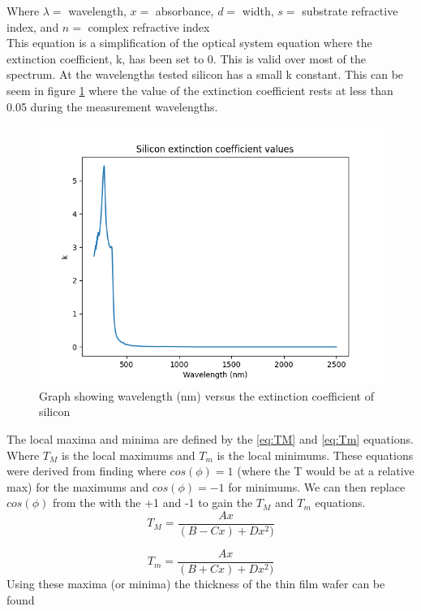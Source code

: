\documentclass[10pt,a4paper]{article}
\begin{document}
\begin{multicols}{2}
Where $\lambda =$ wavelength, $x =$ absorbance, $d =$ width,  $s =$ substrate refractive index, and $n =$ complex refractive index\\
This equation is a simplification of the optical system equation where the extinction coefficient, k, has been set to 0. This is valid over most of the spectrum\cite{marq}. At the wavelengths tested silicon has a small k constant. This can be seem in figure \ref{Sik} where the value of the extinction coefficient rests at less than 0.05 during the measurement wavelengths.
\begin{figure}[H]
\label{Sik}
\includegraphics[scale=0.5]{Sik}
\caption{Graph showing wavelength (nm) versus the extinction coefficient of silicon\cite{siK}}
\end{figure}

The local maxima and minima are defined by the \ref{eq:TM} and \ref{eq:Tm} equations. Where $T_M$ is the local maximums and $T_m$ is the local minimums.
These equations were derived from finding where $cos(\phi) = 1$ (where the T would be at a relative max) for the maximums and  $cos(\phi) = -1$ for minimums. We can then replace $cos(\phi)$ from the with the +1 and -1 to gain the $T_M$ and $T_m$ equations\cite{marq}.
\begin{equation}
\label{eq:TM}
T_M = \dfrac{Ax}{(B-Cx)+Dx^2)}
\end{equation}

\begin{equation}
\label{eq:Tm}
T_m = \dfrac{Ax}{(B+Cx)+Dx^2)}
\end{equation}
Using these maxima (or minima) the thickness of the thin film wafer can be found 


\end{multicols}
\end{document}
